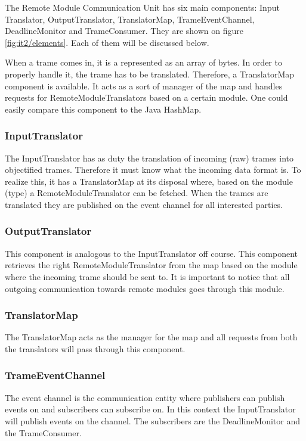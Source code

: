 \npar The Remote Module Communication Unit has six main components: Input
Translator, OutputTranslator, TranslatorMap, TrameEventChannel, DeadlineMonitor
and TrameConsumer. They are shown on figure \ref{fig:it2/elements}. Each of them
will be discussed below.

\npar When a trame comes in, it is a represented as an array of bytes. In
order to properly handle it, the trame has to be translated. Therefore, a
TranslatorMap component is available. It acts as a sort of manager of the map
and handles requests for RemoteModuleTranslators based on a certain module. One
could easily compare this component to the Java HashMap. 

\subsubsection{InputTranslator}

\npar The InputTranslator has as duty the translation of incoming (raw) trames
into objectified trames. Therefore it must know what the incoming data format
is. To realize this, it has a TranslatorMap at its disposal where, based on
the module (type) a RemoteModuleTranslator can be fetched. When the trames are
translated they are published on the event channel for all interested parties.

\subsubsection{OutputTranslator}

\npar This component is analogous to the InputTranslator off course. This
component retrieves the right RemoteModuleTranslator from the map based on the
module where the incoming trame should be sent to. It is important to notice that all
outgoing communication towards remote modules goes through this module.

\subsubsection{TranslatorMap}

\npar The TranslatorMap acts as the manager for the map and all requests from
both the translators will pass through this component. 

\subsubsection{TrameEventChannel}

\npar The event channel is the communication entity where publishers can publish
events on and subscribers can subscribe on. In this context the InputTranslator
will publish events on the channel. The subscribers are the DeadlineMonitor and
the TrameConsumer.

